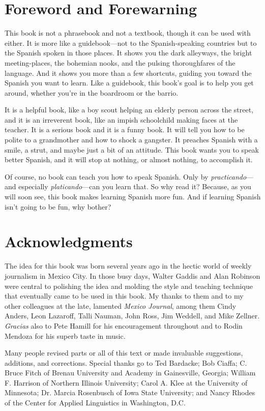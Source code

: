 \chapter{Foreword and Forewarning}

This book is not a phrasebook and not a textbook, though
it can be used with either. It is more like a guidebook---not to the
Spanish-speaking countries but to the Spanish spoken in those places.
It shows you the dark alleyways, the bright meeting-places, the bohemian nooks, and the pulsing thoroughfares of the language. And it
shows you more than a few shortcuts, guiding you toward the Spanish
you want to learn. Like a guidebook, this book's goal is to help you get
around, whether you're in the boardroom or the barrio.

It is a helpful book, like a boy scout helping an elderly person
across the street, and it is an irreverent book, like an impish schoolchild making faces at the teacher. It is a serious book and it is a funny
book. It will tell you how to be polite to a grandmother and how to
shock a gangster. It preaches Spanish with a smile, a strut, and maybe
just a bit of an attitude. This book wants you to speak better Spanish, and it will stop at nothing, or almost nothing, to accomplish it.

Of course, no book can teach you how to speak Spanish. Only
by \emph{practicando}---and especially \emph{platicando}---can you learn that. So
why read it? Because, as you will soon see, this book makes learning
Spanish more fun. And if learning Spanish isn't going to be fun, why
bother?

\chapter{Acknowledgments}

The idea for this book was born several years ago in the hectic world of weekly journalism in Mexico City. In those busy days,
Walter Gaddis and Alan Robinson were central to polishing the idea
and molding the style and teaching technique that eventually came to
be used in this book. My thanks to them and to my other colleagues at
the late, lamented \emph{Mexico Journal}, among them Cindy Anders, Leon
Lazaroff, Talli Nauman, John Ross, Jim Weddell, and Mike Zellner.
\emph{Gracias} also to Pete Hamill for his encouragement throughout and to
Rodin Mendoza for his superb taste in music.

Many people revised parts or all of this text or made invaluable suggestions, additions, and corrections. Special thanks go to
Ted Bardacke; Bob Ciaffa; C. Bruce Fitch of Brenau University and
Academy in Gainesville, Georgia; William F. Harrison of Northern
Illinois University; Carol A. Klee at the University of Minnesota;
Dr. Marcia Rosenbusch of Iowa State University; and Nancy Rhodes
of the Center for Applied Linguistics in Washington, D.C.

